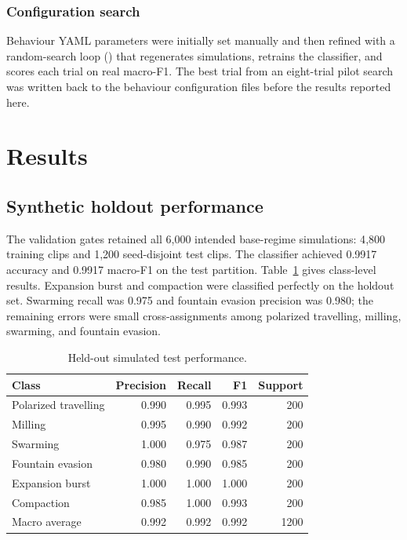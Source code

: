 \documentclass[11pt]{article}
\begin{document}
\subsubsection{Configuration search}

Behaviour YAML parameters were initially set manually and then refined with a random-search loop
() that regenerates simulations, retrains the classifier, and scores each
trial on real macro-F1. The best trial from an eight-trial pilot search was written back to the
behaviour configuration files before the results reported here.

\section{Results}

\subsection{Synthetic holdout performance}

The validation gates retained all 6{,}000 intended base-regime simulations: 4{,}800 training clips and
1{,}200 seed-disjoint test clips. The classifier achieved 0.9917 accuracy and 0.9917 macro-F1 on the test
partition. Table~\ref{tab:sim-results} gives class-level results. Expansion burst and compaction were
classified perfectly on the holdout set. Swarming recall was 0.975 and fountain evasion precision was
0.980; the remaining errors were small cross-assignments among polarized travelling, milling, swarming,
and fountain evasion.

\begin{table}[t]
\centering
\caption{Held-out simulated test performance.}
\label{tab:sim-results}
\small
\begin{tabular}{lrrrr}
\toprule
Class & Precision & Recall & F1 & Support\\
\midrule
Polarized travelling & 0.990 & 0.995 & 0.993 & 200\\
Milling              & 0.995 & 0.990 & 0.992 & 200\\
Swarming             & 1.000 & 0.975 & 0.987 & 200\\
Fountain evasion     & 0.980 & 0.990 & 0.985 & 200\\
Expansion burst      & 1.000 & 1.000 & 1.000 & 200\\
Compaction           & 0.985 & 1.000 & 0.993 & 200\\
\midrule
Macro average        & 0.992 & 0.992 & 0.992 & 1200\\
\bottomrule
\end{tabular}
\end{table}
\end{document}
